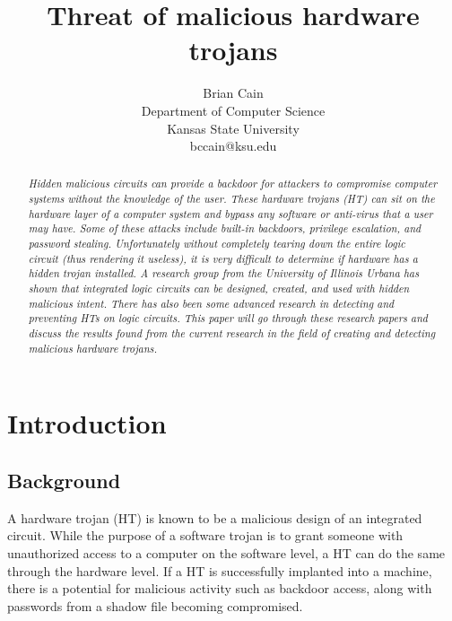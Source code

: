 \documentclass[letterpaper,twocolumn,11pt]{article}
\begin{document}
\date{}

\title{\Large \bf Threat of malicious hardware trojans}

\author{
{\rm Brian Cain}\\
Department of Computer Science\\
Kansas State University\\
bccain@ksu.edu
} %

\maketitle

\thispagestyle{empty}

\begin{abstract}
{\em Hidden malicious circuits can provide a backdoor for attackers to compromise computer systems without the knowledge of the user. These hardware trojans (HT) can sit on the hardware layer of a computer system and bypass any software or anti-virus that a user may have. Some of these attacks include built-in backdoors, privilege escalation, and password stealing. Unfortunately without completely tearing down the entire logic circuit (thus rendering it useless), it is very difficult to determine if hardware has a hidden trojan installed. A research group from the University of Illinois Urbana has shown that integrated logic circuits can be designed, created, and used with hidden malicious intent. There has also been some advanced research in detecting and preventing HTs on logic circuits. This paper will go through these research papers and discuss the results found from the current research in the field of creating and detecting malicious hardware trojans.}
\end{abstract}
\section{Introduction}
\subsection{Background}
A hardware trojan (HT) is known to be a malicious design of an integrated circuit. While the purpose of a software trojan is to grant someone with unauthorized access to a computer on the software level, a HT can do the same through the hardware level. If a HT is successfully implanted into a machine, there is a potential for malicious activity such as backdoor access, along with passwords from a shadow file becoming compromised. \\
\end{document}
